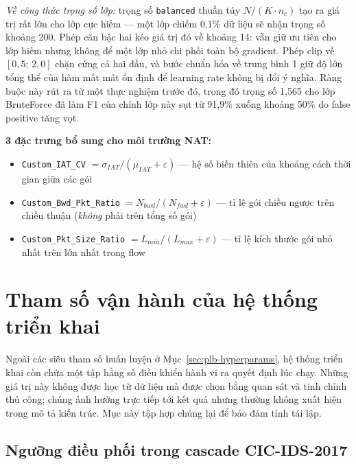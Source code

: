 \documentclass[../DoAn.tex]{subfiles}
\begin{document}
\textit{Về công thức trọng số lớp:} trọng số \texttt{balanced} thuần túy $N/(K \cdot n_c)$ tạo ra giá trị rất lớn cho lớp cực hiếm --- một lớp chiếm 0,1\% dữ liệu sẽ nhận trọng số khoảng 200. Phép căn bậc hai kéo giá trị đó về khoảng 14: vẫn giữ ưu tiên cho lớp hiếm nhưng không để một lớp nhỏ chi phối toàn bộ gradient. Phép clip về $[0{,}5;\,2{,}0]$ chặn cứng cả hai đầu, và bước chuẩn hóa về trung bình 1 giữ độ lớn tổng thể của hàm mất mát ổn định để learning rate không bị đổi ý nghĩa. Ràng buộc này rút ra từ một thực nghiệm trước đó, trong đó trọng số 1,565 cho lớp BruteForce đã làm F1 của chính lớp này sụt từ 91,9\% xuống khoảng 50\% do false positive tăng vọt.

\textbf{3 đặc trưng bổ sung cho môi trường NAT:}
\begin{itemize}
    \item \texttt{Custom\_IAT\_CV} $= \sigma_{IAT} / (\mu_{IAT} + \varepsilon)$ --- hệ số biến thiên của khoảng cách thời gian giữa các gói
    \item \texttt{Custom\_Bwd\_Pkt\_Ratio} $= N_{bwd} / (N_{fwd} + \varepsilon)$ --- tỉ lệ gói chiều ngược trên chiều thuận (\textit{không} phải trên tổng số gói)
    \item \texttt{Custom\_Pkt\_Size\_Ratio} $= L_{min} / (L_{max} + \varepsilon)$ --- tỉ lệ kích thước gói nhỏ nhất trên lớn nhất trong flow
\end{itemize}

\section{Tham số vận hành của hệ thống triển khai}
\label{sec:plb-runtime}

Ngoài các siêu tham số huấn luyện ở Mục~\ref{sec:plb-hyperparams}, hệ thống triển khai còn chứa một tập hằng số điều khiển hành vi ra quyết định lúc chạy. Những giá trị này không được học từ dữ liệu mà được chọn bằng quan sát và tinh chỉnh thủ công; chúng ảnh hưởng trực tiếp tới kết quả nhưng thường không xuất hiện trong mô tả kiến trúc. Mục này tập hợp chúng lại để bảo đảm tính tái lập.

\subsection{Ngưỡng điều phối trong cascade CIC-IDS-2017}
\end{document}

